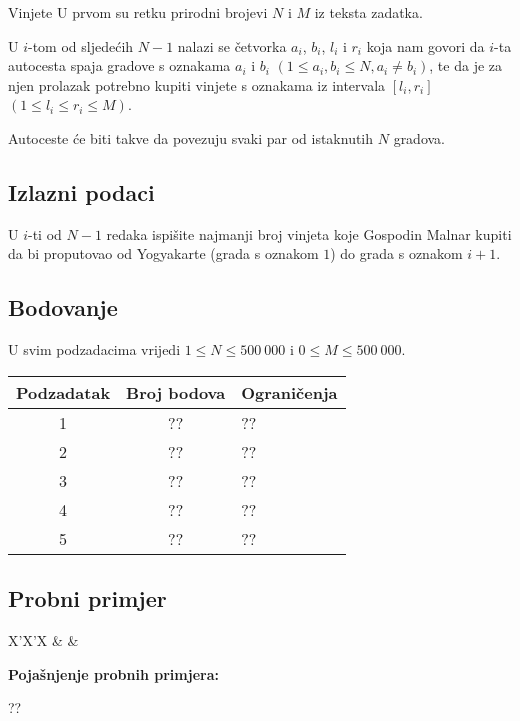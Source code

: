 \begin{statement}[
  problempoints=100,
  timelimit=1 sekunda,
  memorylimit=512 MiB,
]{Vinjete}
U prvom su retku prirodni brojevi $N$ i $M$ iz teksta zadatka.

U $i$-tom od sljedećih $N-1$ nalazi se četvorka $a_i$, $b_i$, $l_i$ i $r_i$
koja nam govori da $i$-ta autocesta spaja gradove s oznakama $a_i$ i $b_i$
$(1 \le a_i, b_i \le N, a_i \ne b_i)$, te da je za njen prolazak potrebno
kupiti vinjete s oznakama iz intervala $[l_i, r_i]$ $(1 \le l_i \le r_i \le
M)$.

Autoceste će biti takve da povezuju svaki par od istaknutih $N$ gradova.

\subsection*{Izlazni podaci}

U $i$-ti od $N - 1$ redaka ispišite najmanji broj vinjeta koje Gospodin Malnar
kupiti da bi proputovao od Yogyakarte (grada s oznakom $1$) do grada s
oznakom $i+1$.

\subsection*{Bodovanje}

U svim podzadacima vrijedi $1 \leq N \leq 500~000$ i $0 \leq M \leq 500~000$.

{\renewcommand{\arraystretch}{1.4}
  \setlength{\tabcolsep}{6pt}
  \begin{tabular}{ccl}
   Podzadatak & Broj bodova & Ograničenja \\ \midrule
    1 & ?? & ?? \\
    2 & ?? & ?? \\
    3 & ?? & ?? \\
    4 & ?? & ?? \\
    5 & ?? & ??
\end{tabular}}

\subsection*{Probni primjer}
\begin{tabularx}{\textwidth}{X'X'X}
 &
 &
\end{tabularx}

\textbf{Pojašnjenje probnih primjera:}

??

\end{statement}

